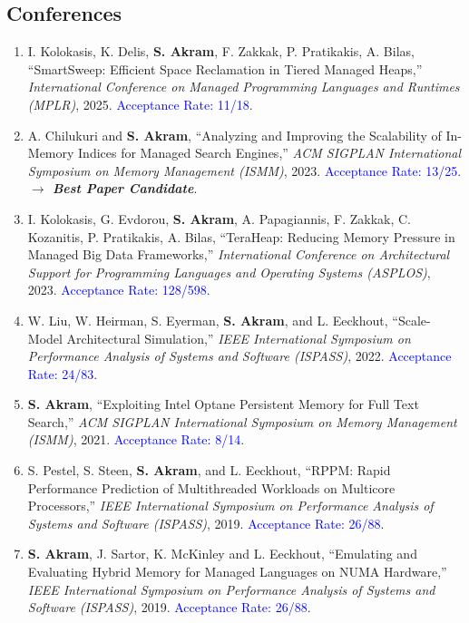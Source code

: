 \documentclass[11pt,a4paper,sans]{moderncv}
\begin{document}
\subsection{Conferences}
{\small
\begin{enumerate}
\item I. Kolokasis, K. Delis, \textbf{S. Akram}, F. Zakkak, P. Pratikakis, A. Bilas, ``SmartSweep: Efficient Space Reclamation in Tiered Managed Heaps,'' \emph{International Conference on Managed Programming Languages and Runtimes (MPLR)}, 2025. \textcolor{blue}{Acceptance Rate: 11/18}.
\item A. Chilukuri and \textbf{S. Akram}, ``Analyzing and Improving the Scalability of In-Memory Indices for Managed Search Engines,'' \emph{ACM SIGPLAN International Symposium on Memory Management (ISMM)}, 2023. \textcolor{blue}{Acceptance Rate: 13/25}. \newline \textcolor{BrickRed}{\textbf{$\longrightarrow$ \emph{Best Paper Candidate}}}.
\item I. Kolokasis, G. Evdorou, \textbf{S. Akram}, A. Papagiannis, F. Zakkak, C. Kozanitis, P. Pratikakis, A. Bilas, ``TeraHeap: Reducing Memory Pressure in Managed Big Data Frameworks,'' \emph{International Conference on Architectural Support for Programming Languages and Operating Systems (ASPLOS)}, 2023. \textcolor{blue}{Acceptance Rate: 128/598}.
\item W. Liu, W. Heirman, S. Eyerman, \textbf{S. Akram}, and L. Eeckhout, ``Scale-Model Architectural Simulation,'' \emph{IEEE International Symposium on Performance Analysis of Systems and Software (ISPASS)}, 2022. \textcolor{blue}{Acceptance Rate: 24/83}.
\item \textbf{S. Akram}, ``Exploiting Intel Optane Persistent Memory for Full Text Search,'' \emph{ACM SIGPLAN International Symposium on Memory Management (ISMM)}, 2021. \textcolor{blue}{Acceptance Rate: 8/14}.
\item S. Pestel, S. Steen, \textbf{S. Akram}, and L. Eeckhout, ``RPPM: Rapid Performance Prediction of Multithreaded Workloads on Multicore Processors,'' \emph{IEEE International Symposium on Performance Analysis of Systems and Software (ISPASS)}, 2019. \textcolor{blue}{Acceptance Rate: 26/88}.
\item \textbf{S. Akram}, J. Sartor, K. McKinley and L. Eeckhout, ``Emulating and Evaluating Hybrid Memory for Managed Languages on NUMA Hardware,'' \emph{IEEE International Symposium on Performance Analysis of Systems and Software (ISPASS)}, 2019. \textcolor{blue}{Acceptance Rate: 26/88}.

\end{enumerate}}
\end{document}

